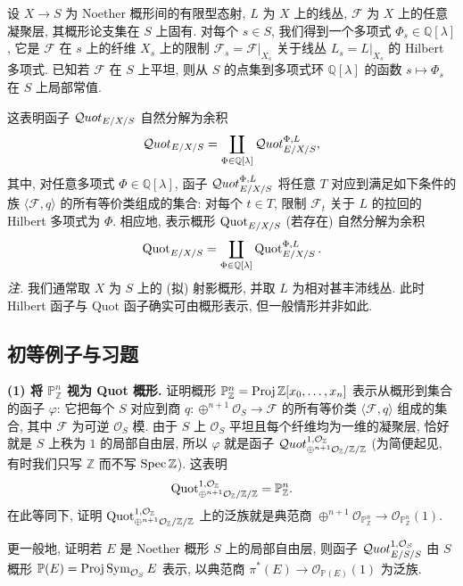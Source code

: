 设 $X\to S$ 为 Noether 概形间的有限型态射, $L$ 为 $X$ 上的线丛, $\mathcal F$ 为 $X$ 上的任意凝聚层, 其概形论支集在 $S$ 上固有. 对每个 $s\in S$, 我们得到一个多项式 $\Phi_s\in\mathbb Q[\lambda]$, 它是 $\mathcal F$ 在 $s$ 上的纤维 $X_s$ 上的限制 $\mathcal F_s=\mathcal F|_{X_s}$ 关于线丛 $L_s=L|_{X_s}$ 的 Hilbert 多项式.
已知若 $\mathcal F$ 在 $S$ 上平坦, 则从 $S$ 的点集到多项式环 $\mathbb Q[\lambda]$ 的函数 $s\mapsto\Phi_s$ 在 $S$ 上局部常值.

这表明函子 $\mathcal{Q}uot_{E/X/S}$ 自然分解为余积
\[
 \mathcal{Q}uot_{E/X/S}=\coprod_{\Phi\in\mathbb Q[\lambda]}\mathcal{Q}uot^{\Phi,L}_{E/X/S},
\]
其中, 对任意多项式 $\Phi\in\mathbb Q[\lambda]$, 函子 $\mathcal{Q}uot^{\Phi,L}_{E/X/S}$ 将任意 $T$ 对应到满足如下条件的族 $\langle\mathcal F,q\rangle$ 的所有等价类组成的集合: 对每个 $t\in T$, 限制 $\mathcal F_t$ 关于 $L$ 的拉回的 Hilbert 多项式为 $\Phi$. 相应地, 表示概形 $\operatorname{Quot}_{E/X/S}$ (若存在) 自然分解为余积
\[
 \operatorname{Quot}_{E/X/S}=\coprod_{\Phi\in\mathbb Q[\lambda]}\operatorname{Quot}^{\Phi,L}_{E/X/S}.
\]
\emph{注.} 我们通常取 $X$ 为 $S$ 上的 (拟) 射影概形, 并取 $L$ 为相对甚丰沛线丛. 此时 Hilbert 函子与 Quot 函子确实可由概形表示, 但一般情形并非如此.

\subsection{初等例子与习题}\label{ch05:sec5.1.5}
\textbf{(1) 将 $\mathbb P^n_{\mathbb Z}$ 视为 Quot 概形.}
证明概形 $\mathbb P^n_{\mathbb Z}=\operatorname{Proj}\mathbb Z[x_0,\ldots,x_n]$ 表示从概形到集合的函子 $\varphi$: 它把每个 $S$ 对应到商 $q:\oplus^{n+1}\mathcal O_S\to\mathcal F$ 的所有等价类 $\langle\mathcal F,q\rangle$ 组成的集合, 其中 $\mathcal F$ 为可逆 $\mathcal O_S$ 模. 由于 $S$ 上 $\mathcal O_S$ 平坦且每个纤维均为一维的凝聚层, 恰好就是 $S$ 上秩为 $1$ 的局部自由层, 所以 $\varphi$ 就是函子 $\mathcal{Q}uot^{1,\mathcal O_{\mathbb Z}}_{\oplus^{n+1}\mathcal O_{\mathbb Z}/\mathbb Z/\mathbb Z}$ (为简便起见, 有时我们只写 $\mathbb Z$ 而不写 $\operatorname{Spec}\mathbb Z$). 这表明
\[
 \operatorname{Quot}^{1,\mathcal O_{\mathbb Z}}_{\oplus^{n+1}\mathcal O_{\mathbb Z}/\mathbb Z/\mathbb Z}=\mathbb P^n_{\mathbb Z}.
\]
在此等同下, 证明 $\operatorname{Quot}^{1,\mathcal O_{\mathbb Z}}_{\oplus^{n+1}\mathcal O_{\mathbb Z}/\mathbb Z/\mathbb Z}$ 上的泛族就是典范商 $\oplus^{n+1}\mathcal O_{\mathbb P^n_{\mathbb Z}}\to\mathcal O_{\mathbb P^n_{\mathbb Z}}(1)$.

更一般地, 证明若 $E$ 是 Noether 概形 $S$ 上的局部自由层, 则函子 $\mathcal{Q}uot^{1,\mathcal O_S}_{E/S/S}$ 由 $S$ 概形 $\mathbb P(E)=\operatorname{Proj}\operatorname{Sym}_{\mathcal O_S}E$ 表示, 以典范商 $\pi^*(E)\to\mathcal O_{\mathbb P(E)}(1)$ 为泛族.

